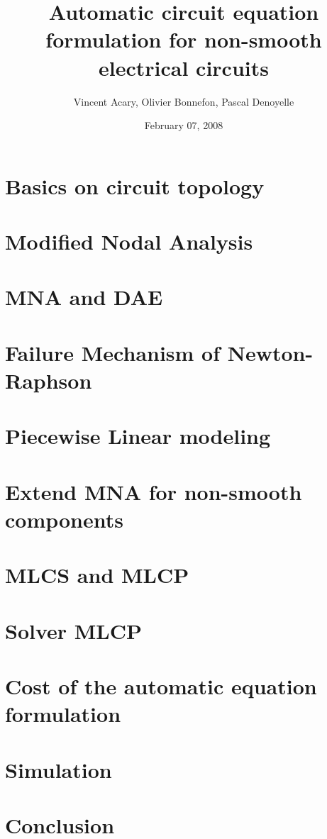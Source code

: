 \documentclass[8pt,xcolor*pst]{beamer}
\title{Automatic circuit equation formulation for non-smooth electrical circuits}
\author{Vincent Acary, Olivier Bonnefon, Pascal Denoyelle}
\date{February 07, 2008}
\institute{INRIA Rh\^one-Alpes}
\begin{document}
\frame{\titlepage}
\frame{\tableofcontents}%
\section{Basics on circuit topology}

\section{Modified Nodal Analysis}

\section{MNA and DAE}

\section{Failure Mechanism of Newton-Raphson}

\section{Piecewise Linear modeling}

\section{Extend MNA for non-smooth components}

\section{MLCS and MLCP}

\section{Solver MLCP}



\section{Cost of the automatic equation formulation}

\section{Simulation}

\section{Conclusion}



\def\newblock{}
\end{document}
